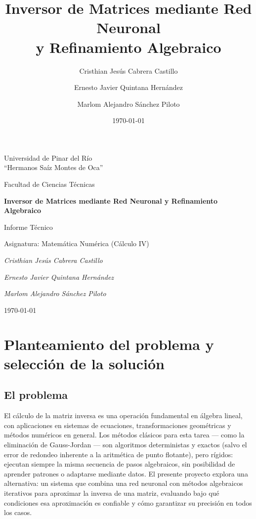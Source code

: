 \documentclass[12pt,a4paper]{article}
\title{\textbf{Inversor de Matrices mediante Red Neuronal\\ y Refinamiento Algebraico}}
\author{Cristhian Jesús Cabrera Castillo}
\author{Ernesto Javier Quintana Hernández}
\author{Marlom Alejandro Sánchez Piloto}
\date{\today}
\begin{document}
\begin{titlepage}
\centering
\vspace*{1cm}
{\large Universidad de Pinar del Río \\ ``Hermanos Saíz Montes de Oca''\par}
\vspace{0.5cm}
{\large Facultad de Ciencias Técnicas \par}
\vspace{2cm}

{\Huge\bfseries Inversor de Matrices mediante Red Neuronal y Refinamiento Algebraico\par}
\vspace{2cm}

{\Large Informe Técnico\par}
\vspace{1cm}

{\large Asignatura: Matemática Numérica (Cálculo IV) \par}
\vspace{0.3cm}
\vspace{2cm}

{\Large\itshape Cristhian Jesús Cabrera Castillo\par}
{\Large\itshape Ernesto Javier Quintana Hernández\par}
{\Large\itshape Marlom Alejandro Sánchez Piloto\par}
\vspace{1cm}

\vfill
{\large \today\par}
\end{titlepage}

\tableofcontents
\newpage

\section{Planteamiento del problema y selección de la solución}

\subsection{El problema}

El cálculo de la matriz inversa es una operación fundamental en álgebra lineal, con aplicaciones en sistemas de ecuaciones, transformaciones geométricas y métodos numéricos en general. Los métodos clásicos para esta tarea --- como la eliminación de Gauss-Jordan --- son algoritmos deterministas y exactos (salvo el error de redondeo inherente a la aritmética de punto flotante), pero rígidos: ejecutan siempre la misma secuencia de pasos algebraicos, sin posibilidad de aprender patrones o adaptarse mediante datos. El presente proyecto explora una alternativa: un sistema que combina una red neuronal con métodos algebraicos iterativos para aproximar la inversa de una matriz, evaluando bajo qué condiciones esa aproximación es confiable y cómo garantizar su precisión en todos los casos.
\end{document}
